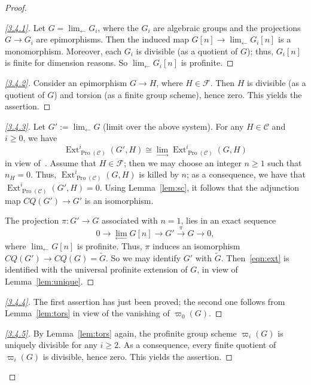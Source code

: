 \documentclass[11pt]{article}
\theoremstyle{definition}
\newenvironment{proofc}{\begin{proof}}{\end{proof}}
\numberwithin{equation}{section}
\newcommand\cC{{\mathcal C}}
\newcommand\cF{{\mathcal F}}
\newcommand\tG{{\widetilde G}}
\DeclareMathOperator{\Ext}{Ext}
\DeclareMathOperator{\Pro}{Pro}
\newenvironment{step}[1]{\begin{proof}[#1]}{\let\qed\relax\end{proof}}
\newenvironment{laststep}[1]{\begin{proof}[#1]}{\end{proof}}
\renewenvironment{proofc}{\begin{proof}}{\end{proof}}
\theoremstyle{remark}
\begin{document}
\begin{proofc}
\begin{step}{\eqref{3.4.1}}%
Let $G = \lim_{\leftarrow} G_i$, where the $G_i$ are algebraic groups and the projections $G \to G_i$ are epimorphisms. Then the induced map $G[n] \to \lim_{\leftarrow} G_i[n]$ is a monomorphism. Moreover, each $G_i$ is divisible (as a quotient of $G$); thus, $G_i[n]$ is finite for dimension reasons. So $\lim_{\leftarrow} G_i[n]$ is profinite.
\end{step}

\begin{step}{\eqref{3.4.2}}%
Consider an epimorphism $G \to H$, where $H \in \cF$. Then $H$ is divisible (as a quotient of $G$) and torsion (as a finite group scheme), hence zero. This yields the assertion.
\end{step}

\begin{step}{\eqref{3.4.3}}%
Let $G' := \lim_{\leftarrow} G$ (limit over the above system). For any $H \in \cC$ and $i \geq 0$, we have
\[
\Ext^i_{\Pro(\cC)}(G',H) \cong
\lim_{\to} \Ext^i_{\Pro(\cC)}(G,H)
\]
in view of~\cite[V.2.3.9]{DG}. Assume that $H \in \cF$; then we may choose an integer $n \geq 1$ such that $n_H = 0$. Thus, $\Ext^i_{\Pro(\cC)}(G,H)$ is killed by $n$; as a consequence, we have that $\Ext^i_{\Pro(\cC)}(G',H) = 0$. Using Lemma~\ref{lem:sc}, it follows that the adjunction map $CQ(G') \to G'$ is an isomorphism.

The projection $\pi : G' \to G$ associated with $n = 1$, lies in an exact sequence
\begin{equation}\label{eqn:ext}
0 \longrightarrow \lim_{\leftarrow} G[n] \longrightarrow G' \stackrel{\pi}{\longrightarrow} G \longrightarrow 0,
\end{equation}
where $\lim_{\leftarrow} G[n]$ is profinite. Thus, $\pi$ induces an isomorphism $CQ(G') \to CQ(G) = \tG$. So we may identify $G'$ with $\tG$. Then~\eqref{eqn:ext} is identified with the universal profinite extension of $G$, in view of Lemma~\ref{lem:unique}.
\end{step}

\begin{step}{\eqref{3.4.4}}%
The first assertion has just been proved; the second one follows from Lemma~\ref{lem:tors} in view of the vanishing of $\varpi_0(G)$.
\end{step}

\begin{laststep}{\eqref{3.4.5}}%
By Lemma~\ref{lem:tors} again, the profinite group scheme $\varpi_i(G)$ is uniquely divisible for any $i \geq 2$. As a consequence, every finite quotient of $\varpi_i(G)$ is divisible, hence zero. This yields the assertion.
\end{laststep}
\let\qed\relax
\end{proofc}
\end{document}
